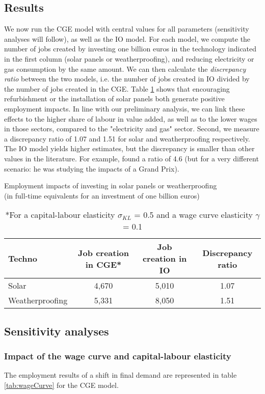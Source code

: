 \subsection{Results}
We now run the CGE model with central values for all parameters (sensitivity analyses will follow), as well as the IO model. 
For each model, we compute the number of jobs created by investing one billion euros in the technology indicated in the first column (solar panels or weatherproofing), and reducing electricity or gas consumption by the same amount.
We can then calculate the \textit{discrepancy ratio} between the two models, i.e. the number of jobs created in IO divided by the number of jobs created in the CGE.
Table \ref{tab:results} shows that encouraging refurbishment or the installation of solar panels both generate positive employment impacts.
In line with our preliminary analysis, we can link these effects to the higher share of labour in value added, as well as to the lower wages in those sectors, compared to the "electricity and gas" sector.
Second, we measure a discrepancy ratio of 1.07 and 1.51 for solar and weatherproofing respectively. The IO model yields higher estimates, but the discrepancy is smaller than other values in the literature. For example, \citet{Dwyer2005} found a ratio of 4.6 (but for a very different scenario: he was studying the impacts of a Grand Prix).

\begin{table}[!h]
	\centering
	\caption{Employment impacts of investing in solar panels or weatherproofing \\ (in full-time equivalents for an investment of one billion euros)}
	\label{tab:results}
	\begin{tabular}{lccc}
		\toprule
		Techno & Job creation in CGE* & Job creation in IO & Discrepancy ratio \\
		\midrule
		Solar & 4,670 & 5,010 & 1.07 \\
		Weatherproofing & 5,331 & 8,050 & 1.51 \\
		\bottomrule
	\end{tabular}
	\caption*{*For a capital-labour elasticity $\sigma_{KL}$ = 0.5 and a wage curve elasticity $\gamma$ = 0.1}
\end{table}


\subsection{Sensitivity analyses}

\subsubsection{Impact of the wage curve and capital-labour elasticity}
The employment results of a shift in final demand are represented in table \ref{tab:wageCurve} for the CGE model.

